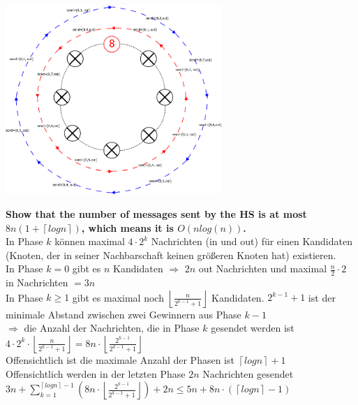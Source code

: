 \begin{minipage}{\linewidth}
	\centering\includegraphics[width=310px]{gfx/HS_p4.png}
	\label{img:hs_p4}
\end{minipage}

\textbf{Show that the number of messages sent by the HS is at most $8n(1+\left\lceil logn\right\rceil )$, which means it is $O(nlog(n))$.}\\ 
In Phase $k$ können maximal $4\cdot2^{k}$ Nachrichten (in und out) für einen Kandidaten (Knoten, der in seiner Nachbarschaft keinen größeren Knoten hat) existieren.\\
In Phase $k=0$ gibt es $n$ Kandidaten $\Rightarrow$ $2n$ out Nachrichten und maximal $\frac{n}{2}\cdot2$ in Nachrichten $=3n$\\
In Phase $k\geq1$ gibt es maximal noch $\left\lfloor \frac{n}{2^{k-1}+1}\right\rfloor $ Kandidaten. $2^{k-1}+1$ ist der minimale Abstand zwischen zwei Gewinnern aus Phase $k-1$\\ $\Rightarrow$ die Anzahl der Nachrichten, die in Phase $k$ gesendet werden ist $4\cdot2^{k}\cdot\left\lfloor \frac{n}{2^{k-1}+1}\right\rfloor =8n\cdot\left\lfloor \frac{2^{k-1}}{2^{k-1}+1}\right\rfloor $\\ 
Offensichtlich ist die maximale Anzahl der Phasen ist $\left\lceil logn\right\rceil +1$\\
Offensichtlich werden in der letzten Phase $2n$ Nachrichten gesendet\\
$3n+\sum\limits _{k=1}^{\left\lceil logn\right\rceil -1}\left(8n\cdot\left\lfloor \frac{2^{k-1}}{2^{k-1}+1}\right\rfloor \right)+2n\leq5n+8n\cdot\left(\left\lceil logn\right\rceil -1\right)$ 


